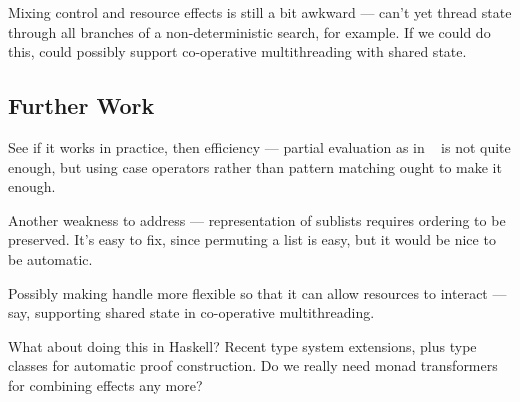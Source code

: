 Mixing control and resource effects is still a bit awkward --- can't yet
thread state through all branches of a non-deterministic search, for example.
If we could do this, could possibly support co-operative multithreading with
shared state.

\subsection{Further Work}

See if it works in practice, then efficiency --- partial evaluation as in
~\cite{Brady2010} is not quite enough, but using case operators rather
than pattern matching ought to make it enough.

Another weakness to address --- representation of sublists requires ordering
to be preserved. It's easy to fix, since permuting a list is easy, but it
would be nice to be automatic.

Possibly making handle more flexible so that it can allow resources to interact
--- say, supporting shared state in co-operative multithreading.

What about doing this in Haskell? Recent type system extensions, plus type
classes for automatic proof construction. Do we really need monad transformers
for combining effects any more?

